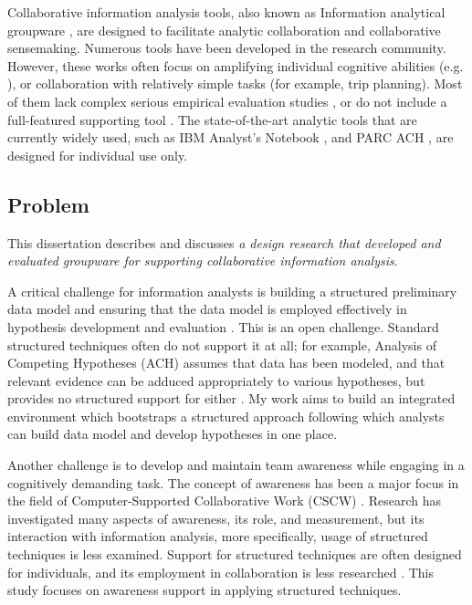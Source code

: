 Collaborative information analysis tools, also known as Information analytical groupware \citep{Grudin1994e}, are designed to facilitate analytic collaboration and collaborative sensemaking.
Numerous tools have been developed in the research community. However, these works often focus on amplifying individual cognitive abilities (e.g. \cite{Stasko2008, Bier2008}), or collaboration with relatively simple tasks (for example, trip planning). Most of them lack complex serious empirical evaluation studies \citep{Goyal2016,Convertino2011}, or do not include a full-featured supporting tool \citep{Carroll2013,Borge2012}. The state-of-the-art analytic tools that are currently widely used, such as IBM Analyst's Notebook \citep{IBM}, and PARC ACH \citep{PARC}, are designed for individual use only. 

\subsection{Problem}

This dissertation describes and discusses \textit{a design research that developed and evaluated groupware for supporting collaborative information analysis}. 

A critical challenge for information analysts is building a structured preliminary data model and ensuring that the data model is employed effectively in hypothesis development and evaluation \citep{wongsuphasawat2019goals, kandel2012enterprise}. This is an open challenge. Standard structured techniques often do not support it at all; for example, Analysis of Competing Hypotheses (ACH) assumes that data has been modeled, and that relevant evidence can be adduced appropriately to various hypotheses, but provides no structured support for either \citep{Gelder2008}. My work aims to build an integrated environment which bootstraps a structured approach following which analysts can build data model and develop hypotheses in one place. 

Another challenge is to develop and maintain team awareness while engaging in a cognitively demanding task. The concept of awareness has been a major focus in the field of Computer-Supported Collaborative Work (CSCW) \citep{Steinmacher2013a, Carroll2009i, Heath2002d}. Research has investigated many aspects of awareness, its role, and measurement, but its interaction with information analysis, more specifically, usage of structured techniques is less examined. Support for structured techniques are often designed for individuals, and its employment in collaboration is less researched \citep{Heuer2009}. This study focuses on awareness support in applying structured techniques.

